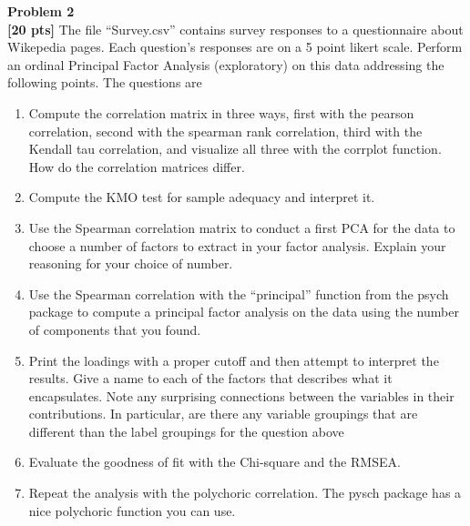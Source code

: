 \documentclass{article}
\newenvironment{problem}[2][Problem]
    { \begin{mdframed}[backgroundcolor=gray!20] \textbf{#1 #2} \\}
    {  \end{mdframed}}
\begin{document}
\newpage
\begin{problem}{2}
\textbf{[20 pts]}
The file “Survey.csv” contains survey responses to a questionnaire about Wikepedia pages. Each question’s responses are on a 5 point likert scale. Perform an ordinal Principal Factor Analysis (exploratory) on this data addressing the following points. The questions are
\begin{enumerate}
	\item Compute the correlation matrix in three ways, first with the pearson correlation, second with the spearman rank correlation, third with the Kendall tau correlation, and visualize all three with the corrplot function. How do the correlation matrices differ.
	\item Compute the KMO test for sample adequacy and interpret it.
	\item Use the Spearman correlation matrix to conduct a first PCA for the data to choose a
number of factors to extract in your factor analysis. Explain your reasoning for your choice
of number.
	\item Use the Spearman correlation with the “principal” function from the psych package to
compute a principal factor analysis on the data using the number of components that you
found.
	\item Print the loadings with a proper cutoff and then attempt to interpret the results. Give a
name to each of the factors that describes what it encapsulates. Note any surprising connections between the variables in their contributions. In particular, are there any variable groupings that are different than the label groupings for the question above
	\item Evaluate the goodness of fit with the Chi-square and the RMSEA.
	\item Repeat the analysis with the polychoric correlation. The pysch package
has a nice polychoric function you can use.
\end{enumerate}
\end{problem}
\end{document}
